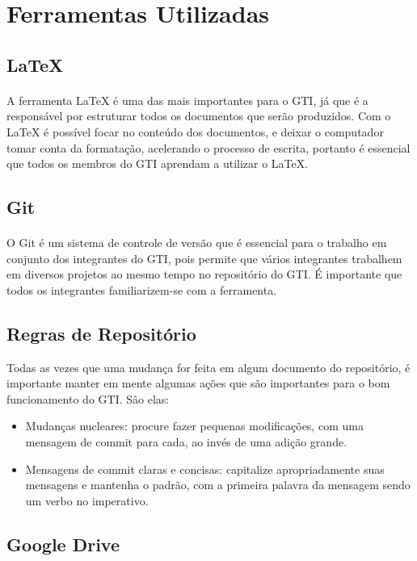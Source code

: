 \documentclass{article}
\begin{document}
\section{Ferramentas Utilizadas}
\subsection{LaTeX}
\paragraph{}
A ferramenta LaTeX é uma das mais importantes para o GTI, já que é a responsável por estruturar todos os documentos que serão produzidos. Com o LaTeX é possível focar no conteúdo dos documentos, e deixar o computador tomar conta da formatação, acelerando o processo de escrita, portanto é essencial que todos os membros do GTI aprendam a utilizar o LaTeX.

\subsection{Git}
\paragraph{}
O Git é um sistema de controle de versão que é essencial para o trabalho em conjunto dos integrantes do GTI, pois permite que vários integrantes trabalhem em diversos projetos ao mesmo tempo no repositório do GTI. É importante que todos os integrantes familiarizem-se com a ferramenta.
\subsection{Regras de Repositório}
Todas as vezes que uma mudança for feita em algum documento do repositório, é importante manter em mente algumas ações que são importantes para o bom funcionamento do GTI. Sâo elas:
\begin{itemize}
\item Mudanças nucleares: procure fazer pequenas modificações, com uma mensagem de commit para cada, ao invés de uma adição grande.
\item Mensagens de commit claras e concisas: capitalize apropriadamente suas mensagens e mantenha o padrão, com a primeira palavra da mensagem sendo um verbo no imperativo.
\end{itemize}

\subsection{Google Drive}
\end{document}

